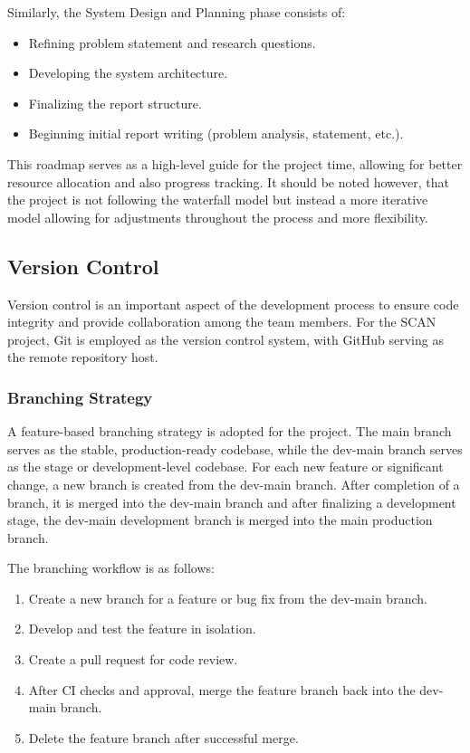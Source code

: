 Similarly, the System Design and Planning phase consists of:

\begin{itemize}
    \item Refining problem statement and research questions.
    \item Developing the system architecture.
    \item Finalizing the report structure.
    \item Beginning initial report writing (problem analysis, statement, etc.).
\end{itemize}

This roadmap serves as a high-level guide for the project time, allowing for better resource allocation and also progress tracking. It should be noted however, that the project is not following the waterfall model but instead a more iterative model allowing for adjustments throughout the process and more flexibility. 

\subsection{Version Control}
Version control is an important aspect of the development process to ensure code integrity and provide collaboration among the team members. For the SCAN project, Git is employed as the version control system, with GitHub serving as the remote repository host.

\subsubsection{Branching Strategy}
A feature-based branching strategy is adopted for the project. The main branch serves as the stable, production-ready codebase, while the dev-main branch serves as the stage or development-level codebase. For each new feature or significant change, a new branch is created from the dev-main branch. After completion of a branch, it is merged into the dev-main branch and after finalizing a development stage, the dev-main development branch is merged into the main production branch.

The branching workflow is as follows:
\begin{enumerate}
    \item Create a new branch for a feature or bug fix from the dev-main branch.
    \item Develop and test the feature in isolation.
    \item Create a pull request for code review.
    \item After CI checks and approval, merge the feature branch back into the dev-main branch.
    \item Delete the feature branch after successful merge.
\end{enumerate}

